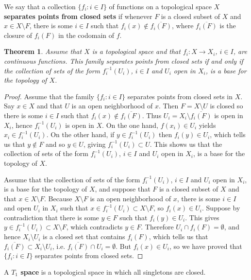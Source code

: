 \documentclass{article}
\newtheorem{theorem}{Theorem}
\theoremstyle{definition}
\begin{document}
We say that a collection $\{f_i: i \in I\}$ of functions on a topological space $X$ \textbf{separates points from closed sets}
if whenever $F$ is a closed subset of $X$ and $x \in X \setminus F$, there is some $i \in I$ such that
$f_i(x) \not \in \overline{f_i(F)}$, where $\overline{f_i(F)}$ is the closure of $f_i(F)$ in the codomain of $f$. 


\begin{theorem}
Assume that $X$ is a topological space and that $f_i:X \to X_i$, $i \in I$, are continuous functions.
This family separates points from closed sets  if and only if the collection of sets
of the form $f_i^{-1}(U_i)$, $i \in I$ and $U_i$ open in $X_i$, is a base for the topology of $X$.
\label{815}
\end{theorem}
\begin{proof}
Assume that the family $\{f_i: i \in I\}$ separates points from closed sets in $X$. Say  $x \in X$ and 
that $U$ is an open neighborhood of $x$. 
Then $F=X \setminus U$ is closed so there is some $i \in I$ such that
$f_i(x) \not \in \overline{f_i(F)}$. 
Thus 
$U_i=X_i \setminus \overline{f_i(F)}$ is open in $X_i$,
hence $f_i^{-1}(U_i)$ is open in $X$. On the one hand, $f(x_i) \in U_i$ yields
$x_i \in f_i^{-1}(U_i)$. On the other hand, if $y \in f_i^{-1}(U_i)$ then
$f_i(y) \in U_i$, which tells us that $y \not \in F$ and so $y \in U$,
giving $f_i^{-1}(U_i) \subset U$. This shows us that the collection of sets of the form
$f_i^{-1}(U_i)$, $i \in I$ and $U_i$ open in $X_i$, is a base for the topology of $X$.

Assume that the collection of sets of the form $f_i^{-1}(U_i)$, $i \in I$ and $U_i$ open in $X_i$, is a base for
the topology of $X$, and suppose that $F$ is a closed subset  of $X$ and that $x \in X \setminus F$. 
Because $X \setminus F$ is an open neighborhood of $x$, there is some $i \in I$ and open  $U_i$ in $X_i$
such that $x \in f_i^{-1}(U_i) \subset X \setminus F$, so $f_i(x) \in U_i$.
Suppose by contradiction that there is some $y \in F$ such that $f_i(y) \in U_i$. This gives 
$y \in f_i^{-1}(U_i) \subset X \setminus F$, which contradicts  $y \in F$. Therefore
$U_i \cap f_i(F) = \emptyset$, and hence $X_i \setminus U_i$ is a closed set that contains
$f_i(F)$, which tells us that $\overline{f_i(F)} \subset X_i \setminus U_i$, i.e.
$\overline{f_i(F)} \cap U_i = \emptyset$. But $f_i(x) \in U_i$, so we have proved that $\{f_i: i \in I\}$ separates points from closed sets.
\end{proof}


A \textbf{$T_1$ space} is a topological space in which all singletons are closed.
\end{document}
